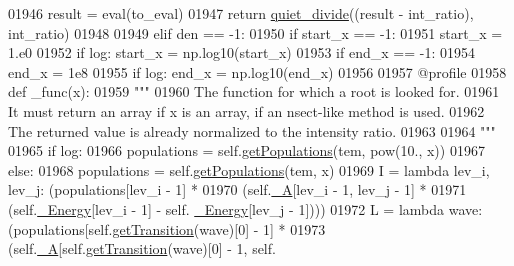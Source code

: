 \begin{DoxyCode}
01946                 result = eval(to\_eval)
01947                 \textcolor{keywordflow}{return} \hyperlink{namespacepyneb_1_1utils_1_1misc_a852d66d22ba9e872484b3346dc28249e}{quiet\_divide}((result - int\_ratio), int\_ratio)
01948             
01949         \textcolor{keywordflow}{elif} den == -1:
01950             \textcolor{keywordflow}{if} start\_x == -1:
01951                 start\_x = 1.e0
01952                 \textcolor{keywordflow}{if} log: start\_x = np.log10(start\_x)
01953             \textcolor{keywordflow}{if} end\_x == -1:
01954                 end\_x = 1e8
01955                 \textcolor{keywordflow}{if} log: end\_x = np.log10(end\_x)
01956 
01957             @profile
01958             \textcolor{keyword}{def }\_func(x):
01959                 \textcolor{stringliteral}{"""}
01960 \textcolor{stringliteral}{                The function for which a root is looked for.}
01961 \textcolor{stringliteral}{                It must return an array if x is an array, if an nsect-like method is used.}
01962 \textcolor{stringliteral}{                The returned value is already normalized to the intensity ratio.}
01963 \textcolor{stringliteral}{                }
01964 \textcolor{stringliteral}{                """}
01965                 \textcolor{keywordflow}{if} log:
01966                     populations = self.\hyperlink{classpyneb_1_1core_1_1pynebcore_1_1_atom_aab7496403c8aaef40ab3b20b5c00e9f0}{getPopulations}(tem, pow(10., x))
01967                 \textcolor{keywordflow}{else}:
01968                     populations = self.\hyperlink{classpyneb_1_1core_1_1pynebcore_1_1_atom_aab7496403c8aaef40ab3b20b5c00e9f0}{getPopulations}(tem, x)
01969                 I = \textcolor{keyword}{lambda} lev\_i, lev\_j: (populations[lev\_i - 1] * 
01970                                           (self.\hyperlink{classpyneb_1_1core_1_1pynebcore_1_1_atom_aa6416fe661b8deaa008179314727e025}{\_A}[lev\_i - 1, lev\_j - 1] * 
01971                                            (self.\hyperlink{classpyneb_1_1core_1_1pynebcore_1_1_atom_a52e68715246d258bf0a14f4bd06e89e4}{\_Energy}[lev\_i - 1] - self.
      \hyperlink{classpyneb_1_1core_1_1pynebcore_1_1_atom_a52e68715246d258bf0a14f4bd06e89e4}{\_Energy}[lev\_j - 1])))
01972                 L = \textcolor{keyword}{lambda} wave: (populations[self.\hyperlink{classpyneb_1_1core_1_1pynebcore_1_1_atom_a7c9f17a3d9e841267add92377d9d1ede}{getTransition}(wave)[0] - 1] * 
01973                                   (self.\hyperlink{classpyneb_1_1core_1_1pynebcore_1_1_atom_aa6416fe661b8deaa008179314727e025}{\_A}[self.\hyperlink{classpyneb_1_1core_1_1pynebcore_1_1_atom_a7c9f17a3d9e841267add92377d9d1ede}{getTransition}(wave)[0] - 1, self.

\end{DoxyCode}
